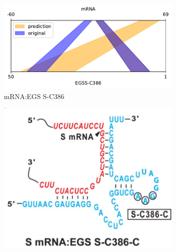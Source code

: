 \documentclass[twoside,a4paper]{report}
\numberwithin{equation}{section}
\begin{document}
\begin{figure}[h!tb]
\begin{subfigure}{.25\textwidth}
	 		\label{fig:SC386}
	 	\end{subfigure}%
 	\begin{subfigure}{.5\textwidth}
 		\centering
 		\includegraphics[width=.9\linewidth]{rricomparison4}
 		\caption{mRNA:EGS S-C386}
 		\label{fig:rricomparison4}
 	\end{subfigure}
	 	\begin{subfigure}{.25\textwidth}
	 		\centering
	 		\includegraphics[width=.9\linewidth]{sc386c}
	 	

\end{subfigure}
\end{figure}
\end{document}
